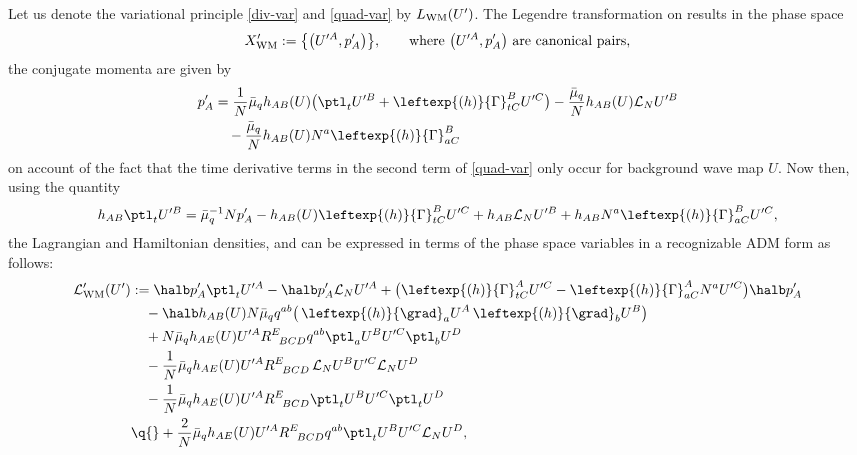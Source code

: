 Let us denote the variational principle \eqref{div-var} and \eqref{quad-var} by $L_{{\rm WM}}(U')$. The Legendre transformation on  results in the phase space
\begin{align*}
X'_{{\rm WM}} := \bigl\{ \bigl(U'^{A}, p'_A\bigr) \bigr\}, \qquad \text{where $\bigl(U'^A, p'_A\bigr)$ are canonical pairs,}
\end{align*}
the conjugate momenta  are given by
\begin{align}
p'_A&{}= \frac{1}{N} \bar{\mu}_q h_{AB}(U) \bigl(\ptl_t U'^B + \leftexp{(h)}{\Gamma}^B_{t C} U'^C\bigr) - \frac{\bar{\mu}_q}{N} h_{AB}(U) \mathcal{L}_N U'^B \notag\\
&\quad{}- \frac{\bar{\mu}_q}{N} h_{AB}(U) N^a \leftexp{(h)}{\Gamma}^B_{a C}\label{u-prime-dot-2}
\end{align}
on account of the fact that the time derivative terms in the second term of \eqref{quad-var} only occur for background wave map $U$. Now then, using the quantity
\begin{align*}
h_{AB} \ptl_t U'^B = \bar{\mu}^{-1}_q N p'_A - h_{AB}(U)\leftexp{(h)}{\Gamma}^B_{tC} U'^C + h_{AB} \mathcal{L}_N U'^B + h_{AB} N^a \leftexp{(h)}{\Gamma}^B_{a C} U'^C,
\end{align*}
the Lagrangian and Hamiltonian densities,  and  can be expressed in terms of the phase space variables  in a recognizable ADM form as follows:
\begin{align*}
\mathcal{L}'_{{\rm WM}} (U') &:=
\halb p'_A \ptl_t U'^A - \halb p'_A \mathcal{L}_N U'^A + \bigl(\leftexp{(h)}{\Gamma}^A_{tC} U'^C - \leftexp{(h)}{\Gamma}^A_{a C} N^a U'^C \bigr)\halb p'_A \notag\\
&\quad{}-\halb h_{AB}(U) N \bar{\mu}_q q^{ab} \bigl(\,\leftexp{(h)}{\grad}_a U^A \, \leftexp{(h)}{\grad}_b U^B \bigr) \notag\\
&\quad{}+ N \bar{\mu}_q h_{AE}(U) U'^A R^E_{\,\,\,\,BCD} q^{a b} \ptl_a U^B U'^C \ptl_b U^D \notag\\
&\quad{} -\frac{1}{N} \bar{\mu}_q h_{AE}(U) U'^A R^E_{\,\,\,\,BCD} \, \mathcal{L}_N U^B U'^C \mathcal{L}_N U^D \notag\\
&\quad{}- \frac{1}{N} \bar{\mu}_q h_{AE}(U) U'^A R^E_{\,\,\,\,BCD} \ptl_t U^B U'^C \ptl_t U^D \notag\\
&\q{} + \frac{2}{N}\bar{\mu}_q h_{AE}(U) U'^A R^E_{\,\,\,\,BCD} q^{a b} \ptl_t U^B U'^C \mathcal{L}_N U^D,
\end{align*}
